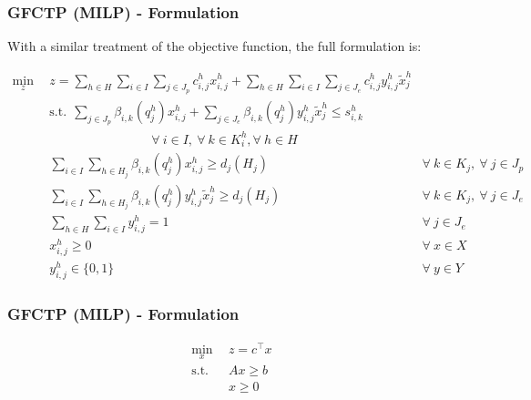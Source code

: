 \begin{frame}[ctb!]
  \frametitle{GFCTP (MILP) - Formulation} 
  
  With a similar treatment of the objective function, the full formulation is:

  \fontsize{7pt}{\baselineskip}\selectfont  
  \begin{subequations}\label{eqs:GFCTP-E}
    \begin{align}
      \label{eq:GRCTP-E_obj}
      \min_{z} \:\: 
      & 
      z = \sum_{h \in H}\sum_{i \in I}\sum_{j \in J_{p}}c_{i,j}^{h} x_{i,j}^{h} 
      + \sum_{h \in H}\sum_{i \in I}\sum_{j \in J_{e}}c_{i,j}^{h} y_{i,j}^{h} \tilde{x}_{j}^{h}
      && \\
      \label{eq:GRCTP-E_sup}
      &
      \text{s.t.} \:\: 
      \sum_{j \in J_{p}}\beta_{i,k}(q_{j}^{h}) x_{i,j}^{h}
      + \sum_{j \in J_{e}}\beta_{i,k}(q_{j}^{h}) y_{i,j}^{h} \tilde{x}_{j}^{h} \leq s_{i,k}^{h} \nonumber \\
      &
      \qquad\qquad\qquad\qquad
      \forall \: i \in I, \: \forall \: k \in K_{i}^{h}, \forall \: {h \in H}\\
      \label{eq:GRCTP-E_dem_p}
      &
      \sum_{i \in I}\sum_{h \in H_{j}} \beta_{i,k}(q_{j}^{h}) x_{i,j}^{h} \geq d_{j}(H_{j})
      &
      \forall \: k \in K_{j}, \: \forall \: j \in J_{p} &\\
      \label{eq:GRCTP-E_dem_e}
      &
      \sum_{i \in I}\sum_{h \in H_{j}}  \beta_{i,k}(q_{j}^{h}) y_{i,j}^{h} \tilde{x}_{j}^{h} \geq d_{j}(H_{j}) 
      &
      \forall \: k \in K_{j}, \: \forall \: j \in J_{e}  &\\
      \label{eq:GRCTP-E_sumy}
      &
      \sum_{h \in H}\sum_{i \in I} y_{i,j}^{h} = 1
      &
      \forall \: j \in J_{e}  &\\
      \label{eq:GRCTP-E_x}
      &
      x_{i,j}^{h} \geq 0
      &
      \forall \: x \in X  &\\
      \label{eq:GRCTP-E_y}
      &
      y_{i,j}^{h} \in \{0,1\}
      &
      \forall \: y \in Y &
    \end{align}
  \end{subequations}

\end{frame}
\begin{frame}[ctb!]
  \frametitle{GFCTP (MILP) - Formulation} 

  \fontsize{7pt}{\baselineskip}\selectfont  

\begin{subequations}\label{eqs:std-form}
  \begin{align}
    \min_{x} \:\: & 
    z = c^{\top} x
    & \label{eqs:std-form_obj} \\
    \text{s.t.} \:\: &
    A x \geq b 
    & \label{eqs:std-form_sup} \\
    &
    x \geq 0
    &\label{eqs:std-form_x}
  \end{align}
\end{subequations}

\end{frame}

